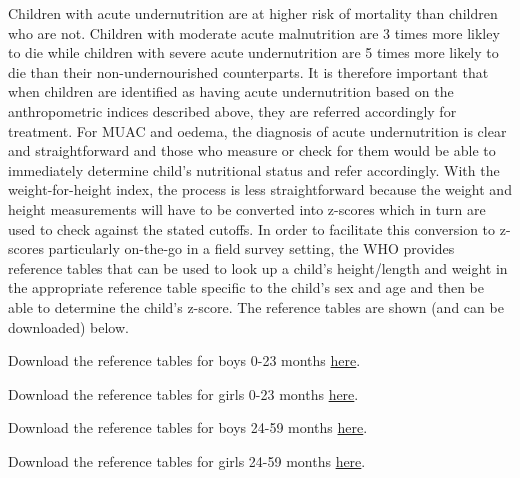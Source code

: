 \documentclass[12pt,]{book}
\theoremstyle{definition}
\theoremstyle{definition}
\theoremstyle{definition}
\theoremstyle{remark}
\let\BeginKnitrBlock\begin \let\EndKnitrBlock\end
\begin{document}
Children with acute undernutrition are at higher risk of mortality than
children who are not. Children with moderate acute malnutrition are 3
times more likley to die while children with severe acute undernutrition
are 5 times more likely to die than their non-undernourished
counterparts. It is therefore important that when children are
identified as having acute undernutrition based on the anthropometric
indices described above, they are referred accordingly for treatment.
For MUAC and oedema, the diagnosis of acute undernutrition is clear and
straightforward and those who measure or check for them would be able to
immediately determine child's nutritional status and refer accordingly.
With the weight-for-height index, the process is less straightforward
because the weight and height measurements will have to be converted
into z-scores which in turn are used to check against the stated
cutoffs. In order to facilitate this conversion to z-scores particularly
on-the-go in a field survey setting, the WHO provides reference tables
that can be used to look up a child's height/length and weight in the
appropriate reference table specific to the child's sex and age and then
be able to determine the child's z-score. The reference tables are shown
(and can be downloaded) below.

\BeginKnitrBlock{rmddownload}
Download the reference tables for boys 0-23 months
\href{\%22pdf/boys_0_24.pdf\%22}{here}.
\EndKnitrBlock{rmddownload}

\BeginKnitrBlock{rmddownload}
Download the reference tables for girls 0-23 months
\href{\%22pdf/girls_0_24.pdf\%22}{here}.
\EndKnitrBlock{rmddownload}

\BeginKnitrBlock{rmddownload}
Download the reference tables for boys 24-59 months
\href{\%22pdf/boys_24_60.pdf\%22}{here}.
\EndKnitrBlock{rmddownload}

\BeginKnitrBlock{rmddownload}
Download the reference tables for girls 24-59 months
\href{\%22pdf/girls_24_60.pdf\%22}{here}.
\EndKnitrBlock{rmddownload}

\newpage
\end{document}
